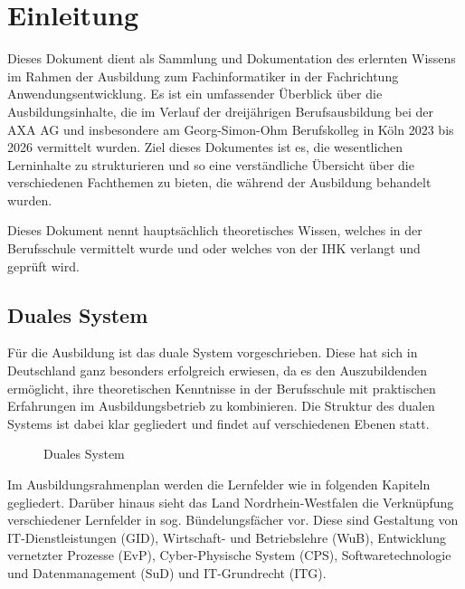 \chapter{Einleitung}

Dieses Dokument dient als Sammlung und Dokumentation des erlernten Wissens im Rahmen der Ausbildung zum Fachinformatiker in der Fachrichtung Anwendungsentwicklung. Es ist ein umfassender Überblick über die Ausbildungsinhalte, die im Verlauf der dreijährigen Berufsausbildung bei der AXA AG und insbesondere am Georg-Simon-Ohm Berufskolleg in Köln 2023 bis 2026 vermittelt wurden. Ziel dieses Dokumentes ist es, die wesentlichen Lerninhalte zu strukturieren und so eine verständliche Übersicht über die verschiedenen Fachthemen zu bieten, die während der Ausbildung behandelt wurden.

Dieses Dokument nennt hauptsächlich theoretisches Wissen, welches in der Berufsschule vermittelt wurde und oder welches von der IHK verlangt und geprüft wird.

\section{Duales System}

Für die Ausbildung ist das duale System vorgeschrieben. Diese hat sich in Deutschland ganz besonders erfolgreich erwiesen, da es den Auszubildenden ermöglicht, ihre theoretischen Kenntnisse in der Berufsschule mit praktischen Erfahrungen im Ausbildungsbetrieb zu kombinieren. Die Struktur des dualen Systems ist dabei klar gegliedert und findet auf verschiedenen Ebenen statt.

\begin{figure}[H]
    \centering
    
    \caption{Duales System}
    \label{fig:dualesSystem}
\end{figure}

% 

Im Ausbildungsrahmenplan werden die Lernfelder wie in folgenden Kapiteln gegliedert. Darüber hinaus sieht das Land Nordrhein-Westfalen die Verknüpfung verschiedener Lernfelder in sog. Bündelungsfächer vor. Diese sind Gestaltung von IT-Dienstleistungen (GID), Wirtschaft- und Betriebslehre (WuB), Entwicklung vernetzter Prozesse (EvP), Cyber-Physische System (CPS), Softwaretechnologie und Datenmanagement (SuD) und IT-Grundrecht (ITG).


